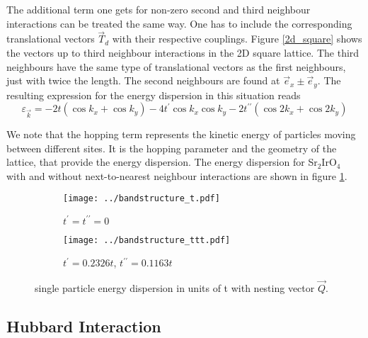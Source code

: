 The additional term one gets for non-zero second and third neighbour interactions can be treated the same way. 
One has to include the corresponding translational vectors $\vec T_d$ with their respective couplings.
Figure \ref{2d_square} shows the vectors up to third neighbour interactions in the 2D square lattice.
The third neighbours have the same type of translational vectors as the first neighbours, just with twice the length.
The second neighbours are found at $\vec e_x \pm \vec e_y$.
The resulting expression for the energy dispersion in this situation reads
\begin{equation}
 \varepsilon_{\vec k } = -2t \left(\cos k_x + \cos k_y \right) -4t^{\prime} \cos k_x \cos k_y  -2t^{\prime \prime} \left( \cos 2k_x + \cos 2k_y \right)
\end{equation}

We note that the hopping term represents the kinetic energy of particles moving between different sites. 
It is the hopping parameter and the 
geometry of the lattice, that provide the energy dispersion. 
The energy dispersion for Sr$_2$IrO$_4$  with and without next-to-nearest neighbour interactions are shown in figure \ref{fig:energie_dispersion}.



\begin{figure} \centering
\begin{subfigure}{0.49\linewidth} \centering
 \texttt{[image: ../bandstructure\_t.pdf]}
 \caption{$ t^{\prime}=t^{\prime \prime} =0$ }
\end{subfigure}
\begin{subfigure}{0.49\linewidth}
  \texttt{[image: ../bandstructure\_ttt.pdf]}
  \caption{ $t^{\prime}= 0.2326t$, $t^{\prime \prime} = 0.1163t$}
\end{subfigure}
\caption{single particle energy dispersion in units of t with nesting vector $\vec Q$. }
\label{fig:energie_dispersion}
\end{figure}




\subsection{Hubbard Interaction}

